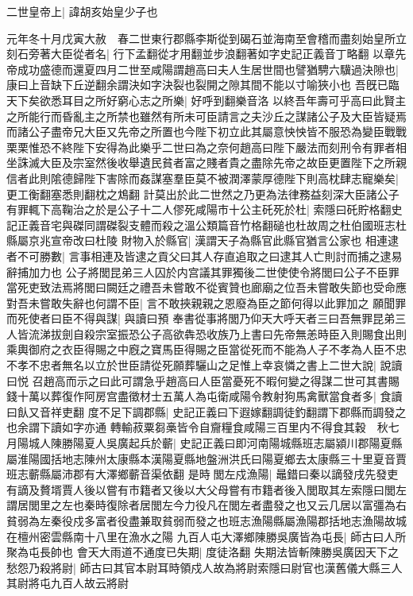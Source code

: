 二世皇帝上|{
	諱胡亥始皇少子也}


元年冬十月戊寅大赦　春二世東行郡縣李斯從到碣石並海南至會稽而盡刻始皇所立刻石旁著大臣從者名|{
	行下孟翻從才用翻並步浪翻著如字史記正義音丁略翻}
以章先帝成功盛德而還夏四月二世至咸陽謂趙高曰夫人生居世間也譬猶騁六驥過決隙也|{
	康曰上音缺下丘逆翻余謂決如字決裂也裂開之隙其間不能以寸喻狹小也}
吾旣已臨天下矣欲悉耳目之所好窮心志之所樂|{
	好呼到翻樂音洛}
以終吾年壽可乎高曰此賢主之所能行而昏亂主之所禁也雖然有所未可臣請言之夫沙丘之謀諸公子及大臣皆疑焉而諸公子盡帝兄大臣又先帝之所置也今陛下初立此其屬意怏怏皆不服恐為變臣戰戰栗栗惟恐不終陛下安得為此樂乎二世曰為之奈何趙高曰陛下嚴法而刻刑令有罪者相坐誅滅大臣及宗室然後收舉遺民貧者富之賤者貴之盡除先帝之故臣更置陛下之所親信者此則隂德歸陛下害除而姦謀塞羣臣莫不被潤澤蒙厚德陛下則高枕肆志寵樂矣|{
	更工衡翻塞悉則翻枕之鴆翻}
計莫出於此二世然之乃更為法律務益刻深大臣諸公子有罪輒下高鞠治之於是公子十二人僇死咸陽市十公主矺死於杜|{
	索隱曰矺貯格翻史記正義音宅與磔同謂磔裂支體而殺之溫公類篇音竹格翻磓也杜故周之杜伯國班志杜縣屬京兆宣帝改曰杜陵}
財物入於縣官|{
	漢謂天子為縣官此縣官猶言公家也}
相連逮者不可勝數|{
	言事相連及皆逮之貢父曰其人存直追取之曰逮其人亡則討而捕之逮易辭捕加力也}
公子將閭昆弟三人囚於内宫議其罪獨後二世使使令將閭曰公子不臣罪當死吏致法焉將閭曰闕廷之禮吾未嘗敢不從賓贊也廊廟之位吾未嘗敢失節也受命應對吾未嘗敢失辭也何謂不臣|{
	言不敢挾親親之恩廢為臣之節何得以此罪加之}
願聞罪而死使者曰臣不得與謀|{
	與讀曰預}
奉書從事將閭乃仰天大呼天者三曰吾無罪昆弟三人皆流涕拔劍自殺宗室振恐公子高欲犇恐收族乃上書曰先帝無恙時臣入則賜食出則乘輿御府之衣臣得賜之中廐之寶馬臣得賜之臣當從死而不能為人子不孝為人臣不忠不孝不忠者無名以立於世臣請從死願葬驪山之足惟上幸哀憐之書上二世大說|{
	說讀曰悦}
召趙高而示之曰此可謂急乎趙高曰人臣當憂死不暇何變之得謀二世可其書賜錢十萬以葬復作阿房宫盡徵材士五萬人為屯衛咸陽令教射狗馬禽獸當食者多|{
	食讀曰飤又音祥吏翻}
度不足下調郡縣|{
	史記正義曰下遐嫁翻調徒釣翻謂下郡縣而調發之也余謂下讀如字亦通}
轉輸菽粟芻槀皆令自齎糧食咸陽三百里内不得食其穀　秋七月陽城人陳勝陽夏人吳廣起兵於蘄|{
	史記正義曰即河南陽城縣班志屬潁川郡陽夏縣屬淮陽國括地志陳州太康縣本漢陽夏縣地盤洲洪氏曰陽夏鄉去太康縣三十里夏音賈班志蘄縣屬沛郡有大澤鄉蘄音渠依翻}
是時閭左戍漁陽|{
	鼂錯曰秦以謫發戌先發吏有謫及贅壻賈人後以嘗有市籍者又後以大父母嘗有市籍者後入閭取其左索隱曰閭左謂居閭里之左也秦時復除者居閭左今力役凡在閭左者盡發之也又云几居以富彊為右貧弱為左秦役戍多富者役盡兼取貧弱而發之也班志漁陽縣屬漁陽郡括地志漁陽故城在檀州密雲縣南十八里在漁水之陽}
九百人屯大澤鄉陳勝吳廣皆為屯長|{
	師古曰人所聚為屯長帥也}
會天大雨道不通度已失期|{
	度徒洛翻}
失期法皆斬陳勝吳廣因天下之愁怨乃殺將尉|{
	師古曰其官本尉耳時領戍人故為將尉索隱曰尉官也漢舊儀大縣三人其尉將屯九百人故云將尉}
